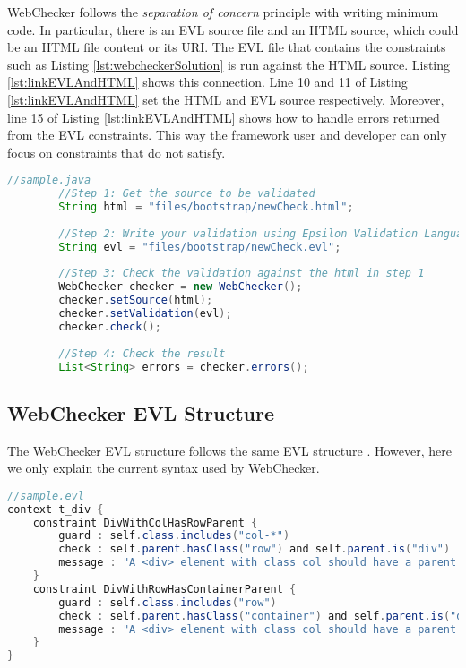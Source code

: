\documentclass[conference]{IEEETran}
\begin{document}
WebChecker follows the \textit{separation of concern} principle with writing minimum code. In particular, there is an EVL source file and an HTML source, which could be an HTML file content or its URI. The EVL file that contains the constraints such as Listing \ref{lst:webcheckerSolution} is run against the HTML source. Listing \ref{lst:linkEVLAndHTML} shows this connection. Line 10 and 11 of Listing \ref{lst:linkEVLAndHTML} set the HTML and EVL source respectively. Moreover, line 15 of Listing \ref{lst:linkEVLAndHTML} shows how to handle errors returned from the EVL constraints. This way the framework user and developer can only focus on constraints that do not satisfy.   

\begin{lstlisting}[language=Java, caption=Checking an EVL file against an HTML source file, label={lst:linkEVLAndHTML}]
 	//sample.java    
		//Step 1: Get the source to be validated
		String html = "files/bootstrap/newCheck.html";
		
		//Step 2: Write your validation using Epsilon Validation Language
		String evl = "files/bootstrap/newCheck.evl";
		
		//Step 3: Check the validation against the html in step 1
		WebChecker checker = new WebChecker();
		checker.setSource(html);
		checker.setValidation(evl);
		checker.check();
		
		//Step 4: Check the result
		List<String> errors = checker.errors();


\end{lstlisting}

\subsection{WebChecker EVL Structure}
The WebChecker EVL structure follows the same EVL structure \cite{Kolovos2009}. However, here we only explain the current syntax used by WebChecker. 


\begin{lstlisting}[language=Java, caption=Enforcing Bootstrap Grid Rule by Using WebChecker, label={lst:webcheckerSolution}]
//sample.evl
context t_div { 
    constraint DivWithColHasRowParent {
        guard : self.class.includes("col-*")
        check : self.parent.hasClass("row") and self.parent.is("div")
        message : "A <div> element with class col should have a parent <div> element with class row."
    }
    constraint DivWithRowHasContainerParent {
        guard : self.class.includes("row")
        check : self.parent.hasClass("container") and self.parent.is("div")
        message : "A <div> element with class col should have a parent <div> element with class row."
    }
}

\end{lstlisting}
\end{document}
